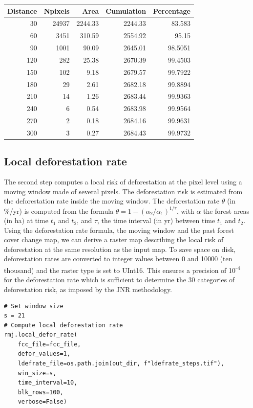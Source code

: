 \documentclass[paper=a4, 12pt, DIV=12]{scrartcl}
\begin{document}
\begin{center}
\begin{tabular}{rrrrr}
Distance & Npixels & Area & Cumulation & Percentage\\
\hline
30 & 24937 & 2244.33 & 2244.33 & 83.583\\
60 & 3451 & 310.59 & 2554.92 & 95.15\\
90 & 1001 & 90.09 & 2645.01 & 98.5051\\
120 & 282 & 25.38 & 2670.39 & 99.4503\\
150 & 102 & 9.18 & 2679.57 & 99.7922\\
180 & 29 & 2.61 & 2682.18 & 99.8894\\
210 & 14 & 1.26 & 2683.44 & 99.9363\\
240 & 6 & 0.54 & 2683.98 & 99.9564\\
270 & 2 & 0.18 & 2684.16 & 99.9631\\
300 & 3 & 0.27 & 2684.43 & 99.9732\\
\end{tabular}
\end{center}

\subsection{Local deforestation rate}
\label{sec:orgc2799e2}

The second step computes a local risk of deforestation at the pixel level using a moving window made of several pixels. The deforestation risk is estimated from the deforestation rate inside the moving window. The deforestation rate \(\theta\) (in \%/yr) is computed from the formula \(\theta=1-(\alpha_2/\alpha_1)^{1/\tau}\), with \(\alpha\) the forest areas (in ha) at time \(t_1\) and \(t_2\), and \(\tau\), the time interval (in yr) between time \(t_1\) and \(t_2\). Using the deforestation rate formula, the moving window and the past forest cover change map, we can derive a raster map describing the local risk of deforestation at the same resolution as the input map. To save space on disk, deforestation rates are converted to integer values between 0 and 10000 (ten thousand) and the raster type is set to UInt16. This ensures a precision of 10\textsuperscript{-4} for the deforestation rate which is sufficient to determine the 30 categories of deforestation risk, as imposed by the JNR methodology.

\begin{verbatim}
# Set window size
s = 21
# Compute local deforestation rate
rmj.local_defor_rate(
    fcc_file=fcc_file,
    defor_values=1,
    ldefrate_file=os.path.join(out_dir, f"ldefrate_steps.tif"),
    win_size=s,
    time_interval=10,
    blk_rows=100,
    verbose=False)
\end{verbatim}
\end{document}
